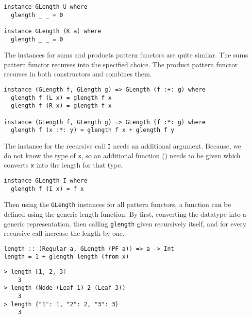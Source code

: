 \begin{verbatim}
instance GLength U where
  glength _ _ = 0

instance GLength (K a) where
  glength _ _ = 0
\end{verbatim}

The instances for sums and products pattern functors are quite similar. The sums pattern functor recurses into the specified choice. The product pattern functor recurses in both constructors and combines them.

\begin{verbatim}
instance (GLength f, GLength g) => GLength (f :+: g) where
  glength f (L x) = glength f x
  glength f (R x) = glength f x

instance (GLength f, GLength g) => GLength (f :*: g) where
  glength f (x :*: y) = glength f x + glength f y
\end{verbatim}

The instance for the recursive call \texttt{I} needs an additional argument. Because, we do not know the type of \texttt{x}, so an additional function () needs to be given which converts \texttt{x} into the length for that type.

\begin{verbatim}
instance GLength I where
  glength f (I x) = f x
\end{verbatim}

Then using the \texttt{GLength} instances for all pattern functors, a function can be defined using the generic length function. By first, converting the datatype into a generic representation, then calling \texttt{glength} given recursively itself, and for every recursive call increase the length by one. 

\begin{verbatim}
length :: (Regular a, GLength (PF a)) => a -> Int
length = 1 + glength length (from x)
\end{verbatim}

\begin{verbatim}
> length [1, 2, 3]
    3
> length (Node (Leaf 1) 2 (Leaf 3))
    3
> length {"1": 1, "2": 2, "3": 3}
    3
\end{verbatim}







% 
